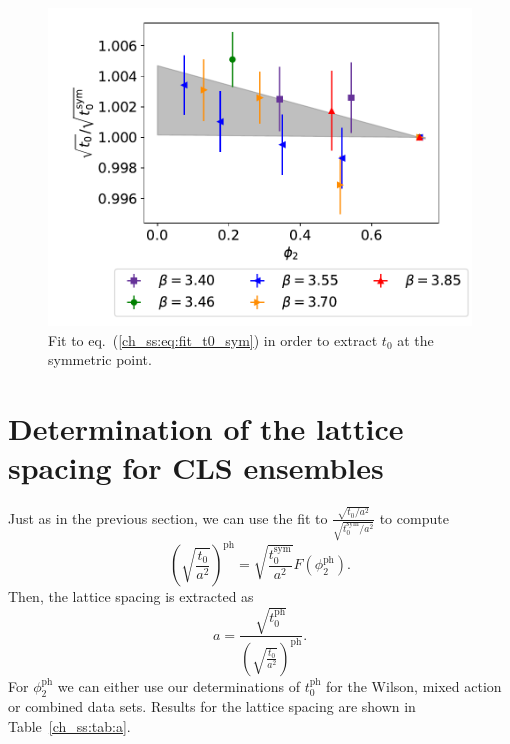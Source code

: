 \begin{figure}
    \centering
    \includegraphics[width=1.\textwidth]{./cap5/figs/t0_sym.pdf}
    \caption{Fit to eq.~(\ref{ch_ss:eq:fit_t0_sym}) in order to extract $t_0$ at the symmetric point. }
    \label{ch_ss:fig:t0_sym}
\end{figure}

\section{Determination of the lattice spacing for CLS ensembles}
\label{ch_ss:sec:t0_sym}

Just as in the previous section, we can use the fit to $\frac{\sqrt{t_0/a^2}}{\sqrt{t_0^{\textrm{sym}}/a^2}}$ to compute 
\begin{equation}
\left(\sqrt{\frac{t_0}{a^2}}\right)^{\textrm{ph}}=\sqrt{\frac{t_0^{\textrm{sym}}}{a^2}}F(\phi_2^{\textrm{ph}}).
\end{equation}
Then, the lattice spacing is extracted as
\begin{equation}
\label{ch_ss:eq:a}
a=\frac{\sqrt{t_0^{\textrm{ph}}}}{\left(\sqrt{\frac{t_0}{a^2}}\right)^{\textrm{ph}}}.
\end{equation}
For $\phi_2^{\textrm{ph}}$ we can either use our determinations	 of $t_0^{\textrm{ph}}$ for the Wilson, mixed action or combined data sets. Results for the lattice spacing are shown in Table~\ref{ch_ss:tab:a}.


